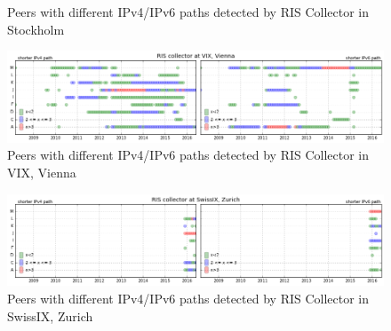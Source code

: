 \begin{appendices}
\begin{figure}[!htb]
		\caption{Peers with different IPv4/IPv6 paths detected by RIS Collector in Stockholm}
		\label{fig:coll-stockholm}
	\end{figure}	
	\begin{figure}[!htb]
		\centering
		\includegraphics[width=6.0in]{img/coll-vienna.png}
		\caption{Peers with different IPv4/IPv6 paths detected by RIS Collector in VIX, Vienna}
		\label{fig:coll-vienna}
	\end{figure}	
	\begin{figure}[!htb]
		\centering
		\includegraphics[width=6.0in]{img/coll-zurich.png}
		\caption{Peers with different IPv4/IPv6 paths detected by RIS Collector in SwissIX, Zurich}
		\label{fig:coll-zurich}
	\end{figure}	
\fi
\end{appendices}

